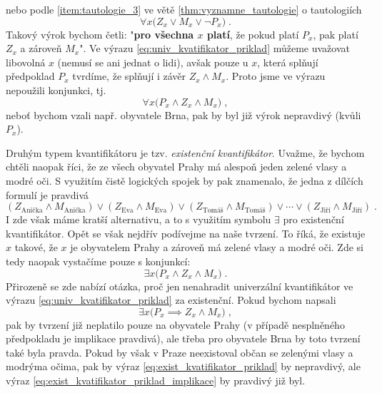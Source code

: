 nebo podle \ref{item:tautologie_3} ve větě \ref{thm:vyznamne_tautologie} o tautologiích
\begin{equation*}
    \forall x \big(Z_x \lor M_x \lor \neg P_x\big)\; .
\end{equation*}
Takový výrok bychom četli: "\textbf{pro všechna $x$ platí}, že pokud platí $P_x$, pak platí $Z_x$ a zároveň $M_x$". Ve výrazu \eqref{eq:univ_kvatifikator_priklad} můžeme uvažovat libovolná $x$ (nemusí se ani jednat o lidi), avšak pouze u $x$, která splňují předpoklad $P_x$ tvrdíme, že splňují i závěr $Z_x \land M_x$. Proto jsme ve výrazu nepoužili konjunkci, tj.
\begin{equation*}
    \forall x \big(P_x \land Z_x \land M_x\big)\; ,
\end{equation*}
neboť bychom vzali např. obyvatele Brna, pak by byl již výrok nepravdivý (kvůli $P_x$).

Druhým typem kvantifikátoru je tzv. \emph{existenční kvantifikátor}. Uvažme, že bychom chtěli naopak říci, že ze všech obyvatel Prahy má alespoň jeden zelené vlasy a modré oči. S využitím čistě logických spojek by pak znamenalo, že jedna z dílčích formulí je pravdivá
\begin{equation*}
    (Z_{\text{Anička}} \land M_{\text{Anička}}) \lor (Z_{\text{Eva}} \land M_{\text{Eva}}) \lor (Z_{\text{Tomáš}} \land M_{\text{Tomáš}}) \lor \cdots \lor (Z_{\text{Jiří}} \land M_{\text{Jiří}})\; .
\end{equation*}
I zde však máme kratší alternativu, a to s využitím symbolu $\exists$ pro existenční kvantifikátor. Opět se však nejdřív podívejme na naše tvrzení. To říká, že existuje $x$ takové, že $x$ je obyvatelem Prahy a zároveň má zelené vlasy a modré oči. Zde si tedy naopak vystačíme pouze s konjunkcí:
\begin{equation}\label{eq:exist_kvatifikator_priklad}
    \exists x \big(P_x \land Z_x \land M_x\big)\; .
\end{equation}
Přirozeně se zde nabízí otázka, proč jen nenahradit univerzální kvantifikátor ve výrazu \eqref{eq:univ_kvatifikator_priklad} za existenční. Pokud bychom napsali
\begin{equation}\label{eq:exist_kvatifikator_priklad_implikace}
    \exists x \big(P_x \implies Z_x \land M_x\big)\; ,
\end{equation}
pak by tvrzení již neplatilo pouze na obyvatele Prahy (v případě nesplněného předpokladu je implikace pravdivá), ale třeba pro obyvatele Brna by toto tvrzení také byla pravda. Pokud by však v Praze neexistoval občan se zelenými vlasy a modrýma očima, pak by výraz \eqref{eq:exist_kvatifikator_priklad} by nepravdivý, ale výraz \eqref{eq:exist_kvatifikator_priklad_implikace} by pravdivý již byl.
\medskip

